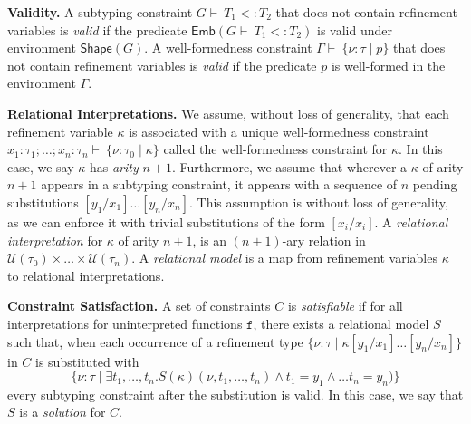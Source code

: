 \documentclass[nocopyrightspace]{sigplanconf}
\def\mypara#1{\smallskip\noindent\textbf{#1}}
\def\set#1{{\{ #1\}}}
\newcommand{\Soln}{S}
\newcommand{\ttf}{\mathtt{f}}
\def\subt{<:}
\def\valu{\nu}
\newcommand{\ftyp}[2]{{{#1}\!:\!{#2}}}
\newcommand{\SUBST}[3]{{#1}[{#3}/{#2}]}
\newcommand{\kvar}{\kappa}
\newcommand{\tenv}{\Gamma}
\newcommand{\renv}{G}
\newcommand{\univ}[1]{\mathcal{U}({#1})}
\newcommand{\typ}{\tau}
\newcommand{\tliqs}{T}
\newcommand{\shape}[1]{\mathsf{Shape}({#1})}
\newcommand{\embed}[1]{\mathsf{Emb}({#1})}
\newcommand{\reftyp}[3]{\set{\ftyp{{#1}}{{#2}} \mid {#3}}}
\newcommand{\deriv}{\vdash\ }
\begin{document}
\mypara{Validity.}
A subtyping constraint ${\renv \deriv \tliqs_1 \subt \tliqs_2}$ 
that does not contain refinement variables
is \emph{valid} if the predicate 
$\embed{\renv \deriv \tliqs_1 \subt \tliqs_2}$ 
is valid under environment $\shape{\renv}$.
A well-formedness constraint ${\tenv \deriv \reftyp{\valu}{\typ}{p}}$ 
that does not contain refinement variables
is \emph{valid} if the predicate $p$ is well-formed 
in the environment $\tenv$.

\mypara{Relational Interpretations.}
We assume, without loss of generality, that each refinement variable $\kvar$ 
is associated with a unique well-formedness constraint
$\ftyp{x_1}{\typ_1};\ldots;\ftyp{x_n}{\typ_n} \deriv \reftyp{\valu}{\typ_0}{\kvar}$ 
called the well-formedness constraint for $\kvar$.
In this case, we say $\kvar$ has \emph{arity} $n+1$.
Furthermore, we assume that wherever a $\kvar$ of arity $n+1$ appears in 
a subtyping constraint, it appears with a sequence of $n$ pending
substitutions $\SUBST{}{x_1}{y_1} \ldots \SUBST{}{x_n}{y_n}$.
This assumption is without loss of generality, as we can enforce it
with trivial substitutions of the form $\SUBST{}{x_i}{x_i}$.
A \emph{relational interpretation} for $\kvar$ of arity $n+1$, is 
an $(n+1)$-ary relation in $\univ{\typ_0}\times \ldots\times\univ{\typ_n}$.
A \emph{relational model} is a map from refinement variables 
$\kvar$ to relational interpretations.

\mypara{Constraint Satisfaction.}
A set of constraints $C$ is \emph{satisfiable} if 
for all interpretations for uninterpreted functions $\ttf$,
there exists a relational model $\Soln$ such that,
when each occurrence of a refinement type 
$\reftyp{\valu}{\typ}{\SUBST{\kvar}{x_1}{y_1} \ldots \SUBST{}{x_n}{y_n}}$ in $C$ 
is substituted with 
$$\reftyp{\valu}{\typ}{\exists
t_1,\ldots,t_n.\Soln(\kvar)(\valu,t_1,\ldots,t_n) \wedge t_1 = y_1\wedge \ldots t_n = y_n)}$$
every subtyping constraint after the substitution is valid. 
In this case, we say that $\Soln$ is a \emph{solution} for $C$.
\end{document}
